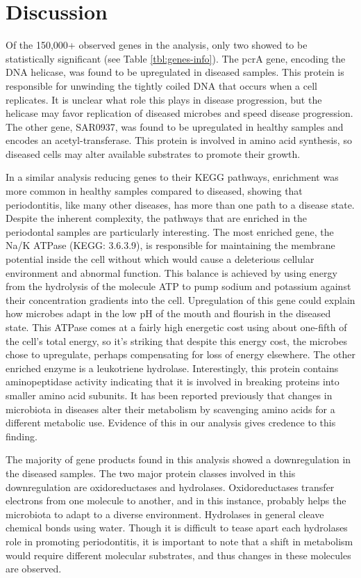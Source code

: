 \documentclass{article}
\begin{document}
\section{Discussion}
Of the 150,000+ observed genes in the analysis, only two showed to be statistically significant (see Table \ref{tbl:genes-info}). The pcrA gene, encoding the DNA helicase, was found to be upregulated in diseased samples. This protein is responsible for unwinding the tightly coiled DNA that occurs when a cell replicates. It is unclear what role this plays in disease progression, but the helicase may favor replication of diseased microbes and speed disease progression. The other gene, SAR0937, was found to be upregulated in healthy samples and encodes an acetyl-transferase. This protein is involved in amino acid synthesis, so diseased cells may alter available substrates to promote their growth.

In a similar analysis reducing genes to their KEGG pathways, enrichment was more common in healthy samples compared to diseased, showing that periodontitis, like many other diseases, has more than one path to a disease state. Despite the inherent complexity, the pathways that are enriched in the periodontal samples are particularly interesting. The most enriched gene, the Na/K ATPase (KEGG: 3.6.3.9), is responsible for maintaining the membrane potential inside the cell without which would cause a deleterious cellular environment and abnormal function. This balance is achieved by using energy from the hydrolysis of the molecule ATP to pump sodium and potassium against their concentration gradients into the cell. Upregulation of this gene could explain how microbes adapt in the low pH of the mouth and flourish in the diseased state. This ATPase comes at a fairly high energetic cost using about one-fifth of the cell's total energy, so it's striking that despite this energy cost, the microbes chose to upregulate, perhaps compensating for loss of energy elsewhere. The other enriched enzyme is a leukotriene hydrolase. Interestingly, this protein contains aminopeptidase activity indicating that it is involved in breaking proteins into smaller amino acid subunits. It has been reported previously that changes in microbiota in diseases alter their metabolism by scavenging amino acids for a different metabolic use. Evidence of this in our analysis gives credence to this finding.

The majority of gene products found in this analysis showed a downregulation in the diseased samples.  The two major protein classes involved in this downregulation are oxidoreductases and hydrolases. Oxidoreductases transfer electrons from one molecule to another, and in this instance, probably helps the microbiota to adapt to a diverse environment. Hydrolases in general cleave chemical bonds using water. Though it is difficult to tease apart each hydrolases role in promoting periodontitis, it is important to note that a shift in metabolism would require different molecular substrates, and thus changes in these molecules are observed.
\end{document}
